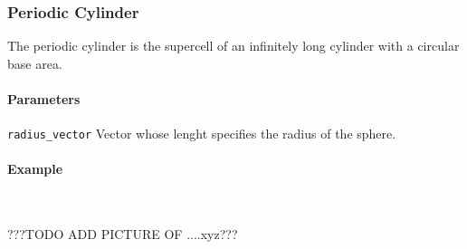 \subsubsection{Periodic Cylinder}
The periodic cylinder is the supercell of an infinitely long cylinder with a circular base area.

\paragraph{Parameters}
\begin{description}
 \item{\lstinline{radius_vector}} Vector whose lenght specifies the radius of the sphere.
\end{description}

\paragraph{Example}\ 


???TODO ADD PICTURE OF ....xyz???